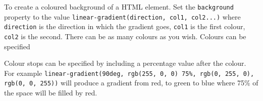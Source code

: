 To create a coloured background of a HTML element. Set the \texttt{background} property to the value \texttt{linear-gradient(direction, col1, col2...)} where \texttt{direction} is the direction in which the gradient goes, \texttt{col1} is the first colour, \texttt{col2} is the second. There can be as many colours as you wish. Colours can be specified 

Colour stops can be specified by including a percentage value after the colour. For example \texttt{linear-gradient(90deg, rgb(255, 0, 0) 75\%, rgb(0, 255, 0), rgb(0, 0, 255))} will produce a gradient from red, to green to blue where 75\% of the space will be filled by red.
